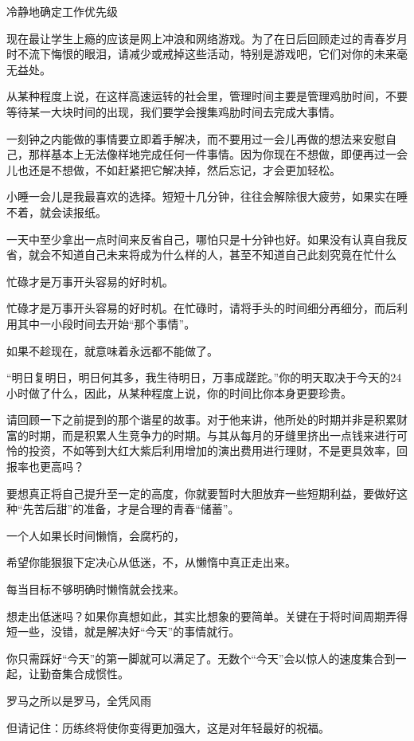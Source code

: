 \documentclass[UTF8,a4paper,8pt]{ctexart}
\begin{document}
 
 冷静地确定工作优先级
 
 
 现在最让学生上瘾的应该是网上冲浪和网络游戏。为了在日后回顾走过的青春岁月时不流下悔恨的眼泪，请减少或戒掉这些活动，特别是游戏吧，它们对你的未来毫无益处。
 
 
 从某种程度上说，在这样高速运转的社会里，管理时间主要是管理鸡肋时间，不要等待某一大块时间的出现，我们要学会搜集鸡肋时间去完成大事情。
 
 
 一刻钟之内能做的事情要立即着手解决，而不要用过一会儿再做的想法来安慰自己，那样基本上无法像样地完成任何一件事情。因为你现在不想做，即便再过一会儿也还是不想做，不如赶紧把它解决掉，然后忘记，才会更加轻松。
 
 
 小睡一会儿是我最喜欢的选择。短短十几分钟，往往会解除很大疲劳，如果实在睡不着，就会读报纸。
 
 
 一天中至少拿出一点时间来反省自己，哪怕只是十分钟也好。如果没有认真自我反省，就会不知道自己未来将成为什么样的人，甚至不知道自己此刻究竟在忙什么
 
 
 忙碌才是万事开头容易的好时机。
 
 
 忙碌才是万事开头容易的好时机。在忙碌时，请将手头的时间细分再细分，而后利用其中一小段时间去开始“那个事情”。
 
 
 如果不趁现在，就意味着永远都不能做了。
 
 
 “明日复明日，明日何其多，我生待明日，万事成蹉跎。”你的明天取决于今天的24小时做了什么，因此，从某种程度上说，你的时间比你本身更要珍贵。
 
 
 请回顾一下之前提到的那个谐星的故事。对于他来讲，他所处的时期并非是积累财富的时期，而是积累人生竞争力的时期。与其从每月的牙缝里挤出一点钱来进行可怜的投资，不如等到大红大紫后利用增加的演出费用进行理财，不是更具效率，回报率也更高吗？
 
 
 要想真正将自己提升至一定的高度，你就要暂时大胆放弃一些短期利益，要做好这种“先苦后甜”的准备，才是合理的青春“储蓄”。
 
 
 一个人如果长时间懒惰，会腐朽的，
 
 
 希望你能狠狠下定决心从低迷，不，从懒惰中真正走出来。
 
 
 每当目标不够明确时懒惰就会找来。
 
 
 想走出低迷吗？如果你真想如此，其实比想象的要简单。关键在于将时间周期弄得短一些，没错，就是解决好“今天”的事情就行。
 
 
 你只需踩好“今天”的第一脚就可以满足了。无数个“今天”会以惊人的速度集合到一起，让勤奋集合成惯性。
 
 
 罗马之所以是罗马，全凭风雨
 
 
 但请记住：历练终将使你变得更加强大，这是对年轻最好的祝福。
 
\end{document}
